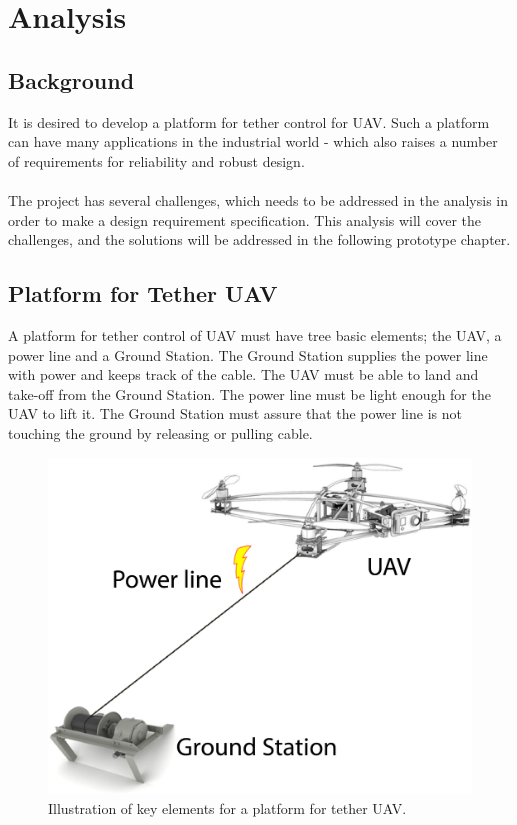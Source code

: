 
\chapter{Analysis}

\section{Background}
It is desired to develop a platform for tether control for UAV. Such a platform can have many applications in the industrial world - which also raises a number of requirements for reliability and robust design. \\
\\
The project has several challenges, which needs to be addressed in the analysis in order to make a design requirement specification. This analysis will cover the challenges, and the solutions will be addressed in the following prototype chapter.



\section{Platform for Tether UAV}
A platform for tether control of UAV must have tree basic elements; the UAV, a power line and a Ground Station. The Ground Station supplies the power line with power and keeps track of the cable. The UAV must be able to land and take-off from the Ground Station. The power line must be light enough for the UAV to lift it. The Ground Station must assure that the power line is not touching the ground by releasing or pulling cable.

\begin{figure}[hbtp]
\centering
\includegraphics[scale=0.5]{graphics/overall-system.png}
\caption{Illustration of key elements for a platform for tether UAV.}
\end{figure}

